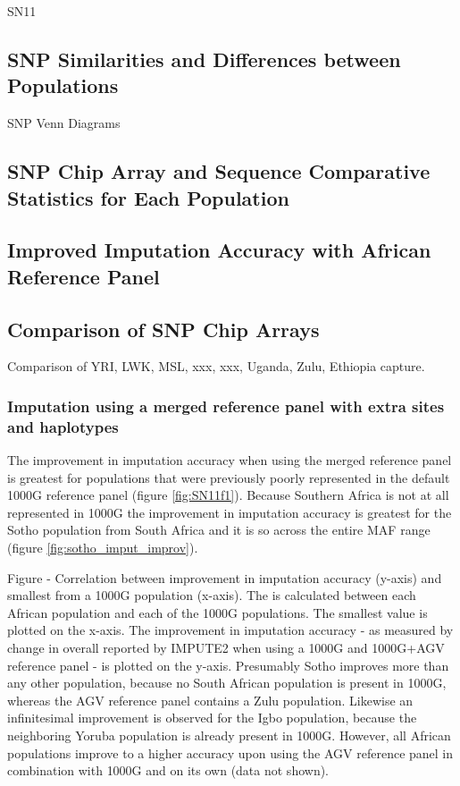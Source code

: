 SN11

\subsection{SNP Similarities and Differences between Populations}
SNP Venn Diagrams
\subsection{SNP Chip Array and Sequence Comparative Statistics for Each Population}
\subsection{Improved Imputation Accuracy with African Reference Panel}
\subsection{Comparison of SNP Chip Arrays}
Comparison of YRI, LWK, MSL, xxx, xxx, Uganda, Zulu, Ethiopia capture.

\subsubsection{Imputation using a merged reference panel with extra sites and haplotypes}

The improvement in imputation accuracy when using the merged reference panel is greatest for populations that were previously poorly represented in the default \gls{1000G} reference panel (figure \ref{fig:SN11f1}). Because Southern Africa is not at all represented in \gls{1000G} the improvement in imputation accuracy is greatest for the Sotho population from South Africa and it is so across the entire \gls{MAF} range (figure \ref{fig:sotho_imput_improv}).




Figure - Correlation between improvement in imputation accuracy (y-axis) and smallest  from a \gls{1000G} population (x-axis). The  is calculated between each African population and each of the \gls{1000G} populations. The smallest value is plotted on the x-axis. The improvement in imputation accuracy - as measured by change in overall  reported by IMPUTE2 when using a \gls{1000G} and \gls{1000G}+\gls{AGV} reference panel - is plotted on the y-axis. Presumably Sotho improves more than any other population, because no South African population is present in \gls{1000G}, whereas the \gls{AGV} reference panel contains a Zulu population. Likewise an infinitesimal improvement is observed for the Igbo population, because the neighboring Yoruba population is already present in \gls{1000G}. However, all African populations improve to a higher accuracy upon using the AGV reference panel in combination with \gls{1000G} and on its own (data not shown).

